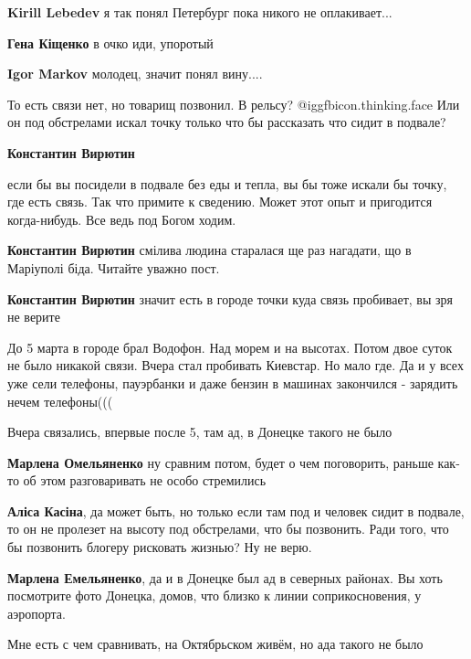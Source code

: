 \begin{itemize}
\begin{itemize}
\textbf{Kirill Lebedev} я так понял Петербург пока никого не оплакивает...

\textbf{Гена Кіщенко} в очко иди, упоротый

\textbf{Igor Markov} молодец, значит понял вину....
\end{itemize} %


То есть связи нет, но товарищ позвонил. В рельсу?  @igg{fbicon.thinking.face}  Или он под обстрелами
искал точку только что бы рассказать что сидит в подвале?

\begin{itemize} %
\textbf{Константин Вирютин} 

если бы вы посидели в подвале без еды и тепла, вы бы тоже искали бы точку, где
есть связь. Так что примите к сведению. Может этот опыт и пригодится
когда-нибудь. Все ведь под Богом ходим.

\textbf{Константин Вирютин} смілива людина старалася ще раз нагадати, що в Маріуполі біда. Читайте уважно пост.

\textbf{Константин Вирютин} значит есть в городе точки куда связь пробивает, вы зря не верите


До 5 марта в городе брал Водофон. Над морем и на высотах. Потом двое суток не
было никакой связи. Вчера стал пробивать Киевстар. Но мало где. Да и у всех уже
сели телефоны, пауэрбанки и даже бензин в машинах закончился - зарядить нечем
телефоны(((

Вчера связались, впервые после 5, там ад, в Донецке такого не было

\textbf{Марлена Омельяненко} ну сравним потом, будет о чем поговорить, раньше как-то об этом разговаривать не особо стремились

\textbf{Аліса Касіна}, да может быть, но только если там под и человек сидит в подвале, то он не пролезет на высоту под обстрелами, что бы позвонить. Ради того, что бы позвонить блогеру рисковать жизнью? Ну не верю.

\textbf{Марлена Емельяненко}, да и в Донецке был ад в северных районах. Вы хоть посмотрите фото Донецка, домов, что близко к линии соприкосновения, у аэропорта.

Мне есть с чем сравнивать, на Октябрьском живём, но ада такого не было


\end{itemize}
\end{itemize}
